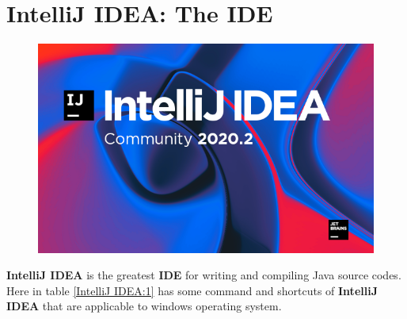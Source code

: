 \section{IntelliJ IDEA: The IDE} %
\begin{figure}
	\includegraphics[width = 0.9\linewidth]{Source Images/IntelliJ IDEA user interface.png} 
\end{figure}

\textbf{IntelliJ IDEA} is the greatest \textbf{IDE} for writing and compiling Java source codes. Here in table \ref{IntelliJ IDEA:1} has some command and shortcuts of \textbf{IntelliJ IDEA} that are applicable to windows operating system.

